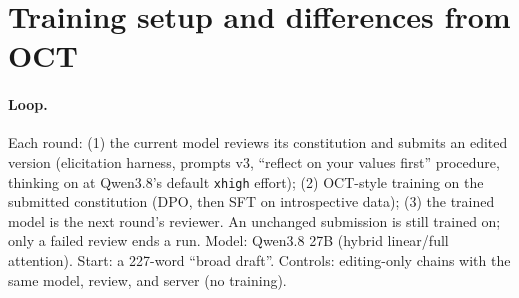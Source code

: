 
\section{Training setup and differences from OCT}
\label{app:setup}

\paragraph{Loop.} Each round: (1) the current model reviews its constitution and submits an edited version
(elicitation harness, prompts v3, ``reflect on your values first'' procedure, thinking on at Qwen3.8's
default \texttt{xhigh} effort); (2) OCT-style training on the submitted constitution (DPO, then SFT on
introspective data); (3) the trained model is the next round's reviewer. An unchanged submission is still
trained on; only a failed review ends a run. Model: Qwen3.8 27B (hybrid linear/full attention). Start: a
227-word ``broad draft''. Controls: editing-only chains with the same model, review, and server (no training).

